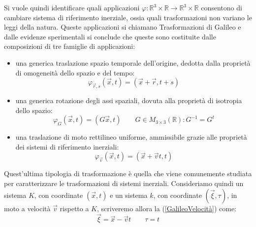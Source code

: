 Si vuole quindi identificare quali applicazioni $\varphi:\mathbb{R}^3\times\mathbb{R}\rightarrow
\mathbb{R}^3\times\mathbb{R}$ consentono di cambiare sistema di riferimento inerziale, ossia quali 
trasformazioni non variano le leggi della natura. Queste applicazioni si chiamano Trasformazioni di 
Galileo e dalle evidenze sperimentali si conclude che queste sono costituite dalle 
composizioni di tre famiglie di applicazioni:
\begin{itemize}
	\item una generica traslazione spazio temporale dell'origine, dedotta dalla proprietà 
	di omogeneità dello spazio e del tempo:
	\begin{equation}
		\varphi_{\vec{r},s}(\vec{x},t)=(\vec{x}+\vec{r},t+s)
		\label{GalileoTraslazoine}
	\end{equation} 
\item una generica rotazione degli assi spaziali, dovuta alla proprietà di isotropia dello spazio:
\begin{equation}
	\varphi_{G}(\vec{x},t)=(G\vec{x},t) \qquad G\in M_{3\times3}(\mathbb{R}):G^{-1}=G^t
	\label{GalileoRotazione}
\end{equation} 
	\item una traslazione di moto rettilineo uniforme, ammissibile grazie alle proprietà dei sistemi 
	di riferimento inerziali:
\begin{equation}
	\varphi_{\vec{v}}(\vec{x},t)=(\vec{x}+\vec{v}t,t)
	\label{GalileoVelocità}
\end{equation} 
\end{itemize}
Quest'ultima tipologia di trasformazione è quella che viene comunemente studiata per caratterizzare le trasformazioni di sistemi inerziali. 
Consideriamo quindi un sistema $K$, con coordinate $(\vec{x},t)$ e un sistema $k$, con 
coordinate $(\vec{\xi},\tau)$, in moto a velocità $\vec{v}$ rispetto a $K$, scriveremo allora la 
(\ref{GalileoVelocità}) come:
\begin{equation}
	\vec\xi=\vec{x}-\vec{v}t \qquad \tau=t
	\label{GalileoEasy}
\end{equation}

